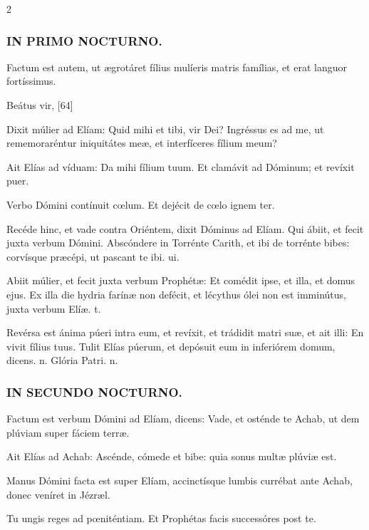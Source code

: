 \documentclass[9pt,twoside]{extarticle}
\begin{document}
\begin{multicols}{2}
\subsubsection*{\center \textsc{IN PRIMO NOCTURNO.}}
\begin{tightlist}{}
\item {} Factum est autem, ut ægrotáret fílius mulíeris matris famílias, et erat languor fortíssimus.
\item {} Beátus vir,  [64]
\item {} Dixit múlier ad Elíam: Quid mihi et tibi, vir Dei? Ingréssus es ad me, ut rememoraréntur iniquitátes meæ, et interfíceres fílium meum?
\item {} Ait Elías ad víduam: Da mihi fílium tuum. Et clamávit ad Dóminum; et revíxit puer.
\item {} Verbo Dómini contínuit cœlum.  Et dejécit de cœlo ignem ter.
\item {}
\item {} Recéde hinc, et vade contra Oriéntem, dixit Dóminus ad Elíam. \textred{*} Qui ábiit, et fecit juxta verbum Dómini.  Abscóndere in Torrénte Carith, et ibi de torrénte bibes: corvísque præcépi, ut pascant te ibi. ui.
\item {} Abiit múlier, et fecit juxta verbum Prophétæ: \textred{*} Et comédit ipse, et illa, et domus ejus.  Ex illa die hydria farínæ non defécit, et lécythus ólei non est imminútus, juxta verbum Elíæ. t.
\item {} Revérsa est ánima púeri intra eum, et revíxit, et trádidit matri suæ, et ait illi: \textred{*} En vivit fílius tuus.  Tulit Elías púerum, et depósuit eum in inferiórem domum, dicens. n. Glória Patri. n.
\end{tightlist}

\subsubsection*{\center \textsc{IN SECUNDO NOCTURNO.}}
\begin{tightlist}{}
\item {} Factum est verbum Dómini ad Elíam, dicens: Vade, et osténde te Achab, ut dem plúviam super fáciem terræ.
\item {} Ait Elías ad Achab: Ascénde, cómede et bibe: quia sonus multæ plúviæ est.
\item {} Manus Dómini facta est super Elíam, accinctísque lumbis currébat ante Achab, donec veníret in Jézræl.
\item {} Tu ungis reges ad pœniténtiam.  Et Prophétas facis successóres post te.
\end{tightlist}


\end{multicols}
\end{document}
